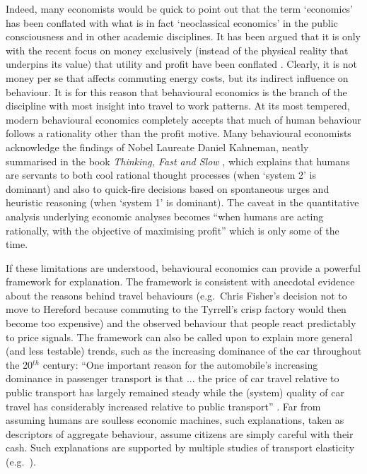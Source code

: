 \documentclass[a4paper, 11pt, twoside]{Thesis}
\begin{document}
Indeed, many economists would be quick to point out that the term `economics'
has been conflated with what is in fact `neoclassical economics' in the public
consciousness and in other academic disciplines.
It has been argued that it is only with the recent
focus on money exclusively (instead of the physical reality that underpins
its value) that utility and profit have been conflated \citep{porritt2007capitalism,
Eisenstein2011}.
Clearly, it is not money per se that affects commuting energy costs, but
its indirect influence on behaviour. It is for this
reason that behavioural economics is the
branch of the discipline with most insight into travel to work patterns.
At its most tempered, modern behavioural economics completely accepts that much
of human behaviour follows a rationality other than the profit
motive. Many behavioural economists acknowledge the findings of Nobel
Laureate Daniel Kahneman, neatly summarised in the
book \emph{Thinking, Fast and Slow} \citep{Kahneman2012}, which
explains that humans are servants to both cool rational thought processes
(when `system 2' is dominant) and also to quick-fire decisions based on
spontaneous urges and heuristic reasoning (when `system 1' is dominant). The
caveat in the quantitative analysis underlying economic analyses
becomes ``when humans are acting
rationally, with the objective of maximising profit'' which is only some of the
time.

If these limitations are understood, behavioural economics can provide a powerful
framework for explanation. The
framework is consistent with anecdotal evidence about the reasons behind travel
behaviours (e.g.~Chris Fisher's decision not to move to Hereford because
commuting to the Tyrrell's crisp factory would then become too expensive) and
the observed behaviour that people react predictably to price signals.
The framework can also be called upon to explain more general (and less
testable) trends, such as the increasing dominance of the car throughout the
20$^{th}$ century: ``One important reason for the automobile's increasing
dominance in passenger transport is that ... the price of car travel relative
to public transport has largely remained steady while the (system) quality of
car travel has considerably increased relative to public transport''
\citep[p.~149]{Exel2011-b-ec}. 
Far from assuming humans are soulless economic machines,
such explanations, taken as descriptors of aggregate behaviour,
assume citizens are simply careful with their cash.
Such explanations are supported by multiple studies of transport elasticity
(e.g.~\citealp{goodwin2004elasticities}).
\end{document}
